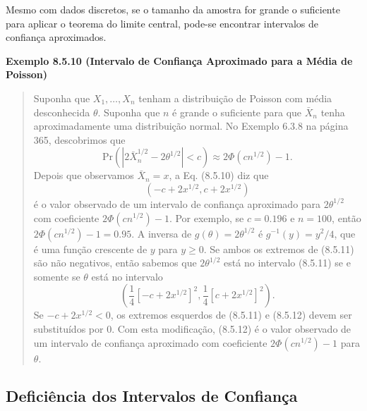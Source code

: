 Mesmo com dados discretos, se o tamanho da amostra for grande o suficiente para aplicar o teorema do limite central, pode-se encontrar intervalos de confiança aproximados.

\vspace{1em}
\noindent\textbf{Exemplo 8.5.10 (Intervalo de Confiança Aproximado para a Média de Poisson)}
\begin{quote}
    Suponha que $X_1, \dots, X_n$ tenham a distribuição de Poisson com média desconhecida $\theta$. Suponha que $n$ é grande o suficiente para que $\bar{X}_n$ tenha aproximadamente uma distribuição normal. No Exemplo 6.3.8 na página 365, descobrimos que
    \begin{equation} \label{eq:8.5.10}
        \text{Pr}(|2\bar{X}_n^{1/2} - 2\theta^{1/2}| < c) \approx 2\Phi(cn^{1/2}) - 1.
    \end{equation}
    Depois que observamos $\bar{X}_n = x$, a Eq. (8.5.10) diz que
    \begin{equation} \label{eq:8.5.11}
        (-c + 2x^{1/2}, c + 2x^{1/2})
    \end{equation}
    é o valor observado de um intervalo de confiança aproximado para $2\theta^{1/2}$ com coeficiente $2\Phi(cn^{1/2}) - 1$. Por exemplo, se $c = 0.196$ e $n=100$, então $2\Phi(cn^{1/2}) - 1 = 0.95$. A inversa de $g(\theta) = 2\theta^{1/2}$ é $g^{-1}(y) = y^2/4$, que é uma função crescente de $y$ para $y \ge 0$. Se ambos os extremos de (8.5.11) são não negativos, então sabemos que $2\theta^{1/2}$ está no intervalo (8.5.11) se e somente se $\theta$ está no intervalo
    \begin{equation} \label{eq:8.5.12}
        \left(\frac{1}{4}[-c + 2x^{1/2}]^2, \frac{1}{4}[c + 2x^{1/2}]^2\right).
    \end{equation}
    Se $-c + 2x^{1/2} < 0$, os extremos esquerdos de (8.5.11) e (8.5.12) devem ser substituídos por 0. Com esta modificação, (8.5.12) é o valor observado de um intervalo de confiança aproximado com coeficiente $2\Phi(cn^{1/2}) - 1$ para $\theta$.
\end{quote}
\vspace{1em}

\subsection*{Deficiência dos Intervalos de Confiança}

